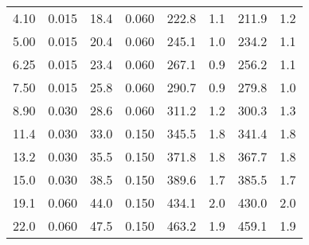 \begin{tabular}{cccccccc}
4.10       & 0.015           & 18.4        &    0.060       & 222.8         & 1.1            & 211.9         & 1.2                      \\                                                                  
5.00       & 0.015           & 20.4        &    0.060       & 245.1         & 1.0            & 234.2         & 1.1                      \\                                                                  
6.25       & 0.015           & 23.4        &    0.060       & 267.1         & 0.9            & 256.2         & 1.1                      \\                                                                  
7.50       & 0.015           & 25.8        &    0.060       & 290.7         & 0.9            & 279.8         & 1.0                      \\                                                                  
8.90       & 0.030           & 28.6        &    0.060       & 311.2         & 1.2            & 300.3         & 1.3                      \\                                                                  
11.4       & 0.030           & 33.0        &    0.150       & 345.5         & 1.8            & 341.4         & 1.8                      \\                                                                  
13.2       & 0.030           & 35.5        &    0.150       & 371.8         & 1.8            & 367.7         & 1.8                      \\                                                                  
15.0       & 0.030           & 38.5        &    0.150       & 389.6         & 1.7            & 385.5         & 1.7                      \\                                                                  
19.1       & 0.060           & 44.0        &    0.150       & 434.1         & 2.0            & 430.0         & 2.0                      \\                                                                  
22.0       & 0.060           & 47.5        &    0.150       & 463.2         & 1.9            & 459.1         & 1.9                      \\  \bottomrule                                                                  

\end{tabular}